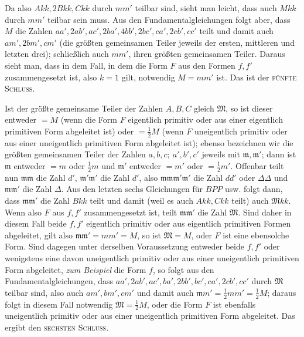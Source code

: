 Da also $Akk,2Bkk,Ckk$ durch $mm'$ teilbar sind, sieht man leicht, dass auch $Mkk$ durch $mm'$ teilbar sein muss. Aus den Fundamentalgleichungen folgt aber, dass $M$ die Zahlen $aa',\allowbreak 2ab',\allowbreak ac',\allowbreak 2ba',\allowbreak 4bb',\allowbreak 2bc',\allowbreak ca',\allowbreak 2cb',\allowbreak cc'$ teilt und damit auch $am',2bm',cm'$ (die größten gemeinsamen Teiler jeweils der ersten, mittleren und letzten drei); schließlich auch $mm'$, ihren größten gemeinsamen Teiler. Daraus sieht man, dass in dem Fall, in dem die Form $F$ aus den Formen $f,f'$ zusammengesetzt ist, also $k=1$ gilt, notwendig $M=mm'$ ist. Das ist der \textsc{fünfte Schluss}.

Ist der größte gemeinsame Teiler der Zahlen $A,B,C$ gleich $\mathfrak{M}$, so ist dieser entweder $=M$ (wenn die Form $F$ eigentlich primitiv oder aus einer eigentlich primitiven Form abgeleitet ist) oder $=\frac{1}{2}M$ (wenn $F$ uneigentlich primitiv oder aus einer uneigentlich primitiven Form abgeleitet ist); ebenso bezeichnen wir die größten gemeinsamen Teiler der Zahlen $a,b,c;\ a',b',c'$ jeweils mit $\mathfrak{m},\mathfrak{m}'$; dann ist $\mathfrak{m}$ entweder $=m$ oder $\frac{1}{2}m$ und $\mathfrak{m}'$ entweder $=m'$ oder $=\frac{1}{2}m'$. Offenbar teilt nun $\mathfrak{m}\mathfrak{m}$ die Zahl $d'$, $\mathfrak{m}'\mathfrak{m}'$ die Zahl $d'$, also $\mathfrak{m}\mathfrak{m}\mathfrak{m}'\mathfrak{m}'$ die Zahl $dd'$ oder $\Delta\Delta$ und $\mathfrak{m}\mathfrak{m}'$ die Zahl $\Delta$.
Aus den letzten sechs Gleichungen für $BPP$ usw. folgt dann, dass $\mathfrak{m}\mathfrak{m}'$ die Zahl $Bkk$ teilt und damit (weil es auch $Akk,Ckk$ teilt) auch $\mathfrak{M}kk$. Wenn also $F$ aus $f,f'$ zusammengesetzt ist, teilt $\mathfrak{m}\mathfrak{m}'$ die Zahl $\mathfrak{M}$. Sind daher in diesem Fall beide $f,f'$ eigentlich primitiv oder aus eigentlich primitiven Formen abgeleitet, gilt also $\mathfrak{m}\mathfrak{m}'=mm'=M$, so ist $\mathfrak{M}=M$, oder $F$ ist eine ebensolche Form. Sind dagegen unter derselben Voraussetzung entweder beide $f,f'$ oder wenigstens eine davon uneigentlich primitiv oder aus einer uneigentlich primitiven Form abgeleitet, \textit{zum Beispiel} die Form $f$, so folgt aus den Fundamentalgleichungen, dass $aa',2ab',ac',ba',2bb',bc',ca',2cb',cc'$ durch $\mathfrak{M}$ teilbar sind, also auch $am',bm',cm'$ und damit auch $\mathfrak{m}m'=\frac{1}{2}mm'=\frac{1}{2}M$; daraus folgt in diesem Fall notwendig $\mathfrak{M}=\frac{1}{2}M$, oder die Form $F$ ist ebenfalls uneigentlich primitiv oder aus einer uneigentlich primitiven Form abgeleitet. Das ergibt den \textsc{sechsten Schluss}.


